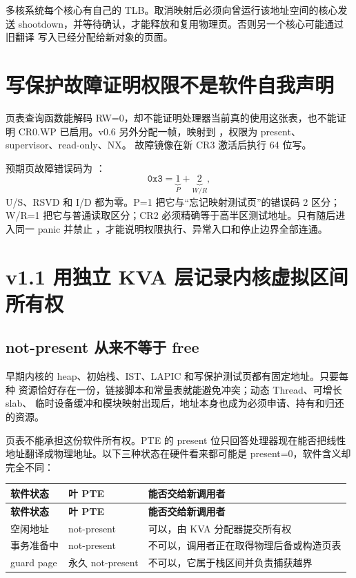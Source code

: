 多核系统每个核心有自己的 TLB。取消映射后必须向曾运行该地址空间的核心发送
shootdown，并等待确认，才能释放和复用物理页。否则另一个核心可能通过旧翻译
写入已经分配给新对象的页面。

\section{写保护故障证明权限不是软件自我声明}

页表查询函数能解码 RW=0，却不能证明处理器当前真的使用这张表，也不能证明
CR0.WP 已启用。v0.6 另外分配一帧，映射到
，权限为 present、supervisor、read-only、NX。
故障镜像在新 CR3 激活后执行 64 位写。

预期页故障错误码为 ：
\[
  \mathtt{0x3}=\underbrace{1}_{P}
                 +\underbrace{2}_{W/R},
\]
U/S、RSVD 和 I/D 都为零。P=1 把它与“忘记映射测试页”的错误码 2 区分；
W/R=1 把它与普通读取区分；CR2 必须精确等于高半区测试地址。只有随后进入同一
panic 并禁止 ，才能说明权限执行、异常入口和停止边界全部连通。

\section{v1.1 用独立 KVA 层记录内核虚拟区间所有权}

\subsection{not-present 从来不等于 free}

早期内核的 heap、初始栈、IST、LAPIC 和写保护测试页都有固定地址。只要每种
资源恰好存在一份，链接脚本和常量表就能避免冲突；动态 Thread、可增长 slab、
临时设备缓冲和模块映射出现后，地址本身也成为必须申请、持有和归还的资源。

页表不能承担这份软件所有权。PTE 的 present 位只回答处理器现在能否把线性
地址翻译成物理地址。以下三种状态在硬件看来都可能是 present=0，软件含义却
完全不同：

\begin{longtable}{L{0.24\textwidth}L{0.22\textwidth}L{0.40\textwidth}}
\toprule
\textbf{软件状态} & \textbf{叶 PTE} & \textbf{能否交给新调用者}\\
\midrule
\endfirsthead
\toprule
\textbf{软件状态} & \textbf{叶 PTE} & \textbf{能否交给新调用者}\\
\midrule
\endhead
空闲地址 & not-present & 可以，由 KVA 分配器提交所有权\\
事务准备中 & not-present & 不可以，调用者正在取得物理后备或构造页表\\
guard page & 永久 not-present & 不可以，它属于栈区间并负责捕获越界\\
\bottomrule
\end{longtable}

